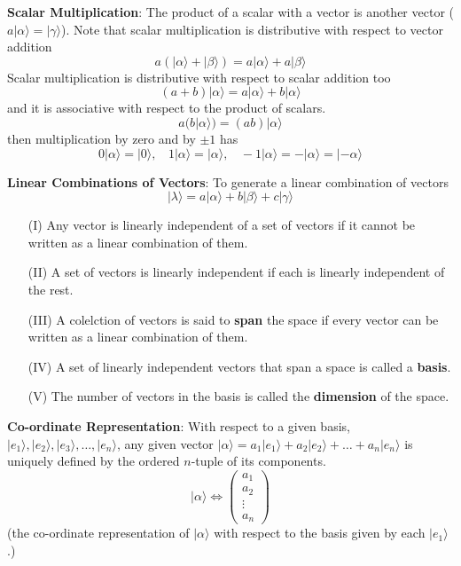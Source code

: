 \documentclass[english, 11pt]{article}
\newcommand{\ket}[1]{| #1 \rangle}
\newcommand{\ka}{| \alpha \rangle}
\newcommand{\kb}{| \beta \rangle}
\newcommand{\kg}{| \gamma \rangle}
\begin{document}
        {\bf Scalar Multiplication}: The product of a scalar with a vector is another vector ($a\ket{\alpha} = \ket{\gamma}$). Note that scalar multiplication is distributive with respect to vector addition
        \[ a(\ket{\alpha} + \ket{\beta}) = a\ket{\alpha} + a\ket{\beta} \]
        Scalar multiplication is distributive with respect to scalar addition too
        \[ (a + b)\ket{\alpha} = a\ket{\alpha} + b\ket{\alpha} \]
        and it is associative with respect to the product of scalars.
        \[ a(b \ket{\alpha}) = (ab)\ket{\alpha} \]
        then multiplication by zero and by $\pm 1$ has
        \[ 0\ket{\alpha} = \ket{0}, \ \ \ \ 1\ket{\alpha} = \ket{\alpha}, \ \ \ \ -1\ket{\alpha} = -\ket{\alpha} = \ket{-\alpha} \]
        \newline

        {\bf Linear Combinations of Vectors}: To generate a linear combination of vectors
        \[ \ket{\lambda} = a\ka + b\kb + c\kg \]
        \begin{itemize}
          \item[(I)] Any vector is linearly independent of a set of vectors if it cannot be written as a linear combination of them.
          \item[(II)] A set of vectors is linearly independent if each is linearly independent of the rest.
          \item[(III)] A colelction of vectors is said to {\bf span} the space if every vector can be written as a linear combination of them.
          \item[(IV)] A set of linearly independent vectors that span a space is called a {\bf basis}.
          \item[(V)] The number of vectors in the basis is called the {\bf dimension} of the space.\newline
        \end{itemize}

        {\bf Co-ordinate Representation}: With respect to a given basis, $\ket{e_1}, \ket{e_2}, \ket{e_3}, \hdots, \ket{e_n}$, any given vector $\ka = a_1 \ket{e_1} + a_2\ket{e_2} + \hdots + a_n \ket{e_n}$ is uniquely defined by the ordered $n$-tuple of its components.
        \[ \ka \iff \left(\begin{matrix}a_1 \\ a_2 \\ \vdots \\ a_n\end{matrix}\right) \]
        (the co-ordinate representation of $\ka$ with respect to the basis given by each $\ket{e_1}$.)
\end{document}
